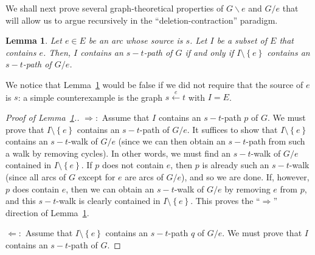 \documentclass[12pt]{amsart}
\newtheorem{lemma}[theorem]{Lemma}
\theoremstyle{definition}
\newcommand{\set}[1]{\left\{ #1 \right\}}
\begin{document}
We shall next prove several graph-theoretical properties of $G \backslash e$ and $G / e$ that will allow us to argue recursively in the ``deletion-contraction'' paradigm.

\begin{lemma} \label{lem.G/e.stpath}
    Let $e \in E$ be an arc whose source is $s$.
    Let $I$ be a subset of $E$ that contains $e$.
    Then, $I$ contains an $s-t$-path of $G$ if and only if $I \setminus \set{e}$ contains an $s-t$-path of $G / e$.
\end{lemma}

We notice that Lemma~\ref{lem.G/e.stpath} would be false if we did not require that the source of $e$ is $s$: a simple counterexample is the graph $s \overset{e}{\longleftarrow} t$ with $I = E$.

\begin{proof}[Proof of Lemma~\ref{lem.G/e.stpath}.]

$\Longrightarrow:$
Assume that $I$ contains an $s-t$-path $p$ of $G$.
We must prove that $I \setminus \set{e}$ contains an $s-t$-path of $G / e$.
It suffices to show that $I \setminus \set{e}$ contains an $s-t$-walk of $G / e$ (since we can then obtain an $s-t$-path from such a walk by removing cycles).
In other words, we must find an $s-t$-walk of $G / e$ contained in $I \setminus \set{e}$.
If $p$ does not contain $e$, then $p$ is already such an $s-t$-walk (since all arcs of $G$ except for $e$ are arcs of $G / e$), and so we are done.
If, however, $p$ does contain $e$, then we can obtain an $s-t$-walk of $G / e$
by removing $e$ from $p$,
and this $s-t$-walk is clearly contained in $I \setminus \set{e}$.
This proves the ``$\Longrightarrow$'' direction of Lemma~\ref{lem.G/e.stpath}.

$\Longleftarrow:$
Assume that $I \setminus \set{e}$ contains an $s-t$-path $q$ of $G / e$.
We must prove that $I$ contains an $s-t$-path of $G$.


\end{proof}
\end{document}
